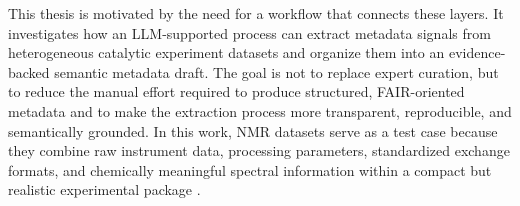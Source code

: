 This thesis is motivated by the need for a workflow that connects these layers.
It investigates how an LLM-supported process can extract metadata signals from heterogeneous catalytic experiment datasets and organize them into an evidence-backed semantic metadata draft.
The goal is not to replace expert curation, but to reduce the manual effort required to produce structured, \ac{FAIR}-oriented metadata and to make the extraction process more transparent, reproducible, and semantically grounded.
In this work, \ac{NMR} datasets serve as a test case because they combine raw instrument data, processing parameters, standardized exchange formats, and chemically meaningful spectral information within a compact but realistic experimental package \cite{Schober2018nmrML}.
